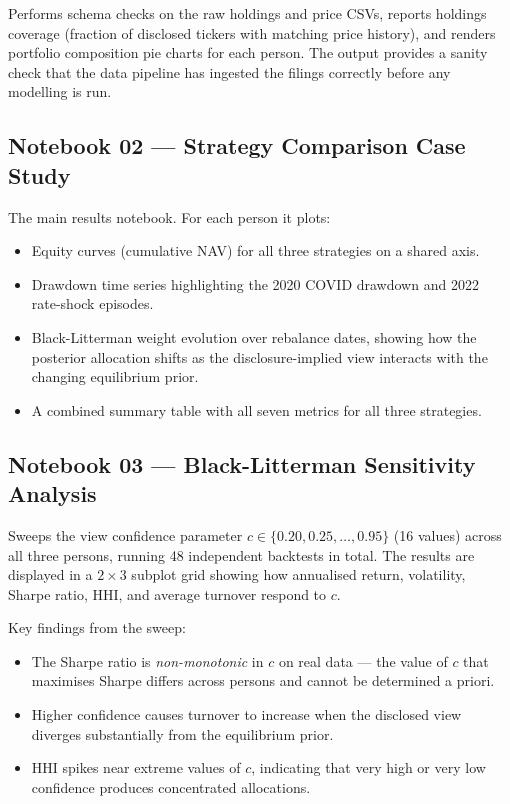 \documentclass[11pt, a4paper]{article}
\begin{document}
Performs schema checks on the raw holdings and price CSVs, reports holdings
coverage (fraction of disclosed tickers with matching price history), and
renders portfolio composition pie charts for each person. The output provides
a sanity check that the data pipeline has ingested the filings correctly before
any modelling is run.

\subsection{Notebook 02 --- Strategy Comparison Case Study}

The main results notebook. For each person it plots:
\begin{itemize}
  \item Equity curves (cumulative NAV) for all three strategies on a shared axis.
  \item Drawdown time series highlighting the 2020 COVID drawdown and 2022
        rate-shock episodes.
  \item Black-Litterman weight evolution over rebalance dates, showing how the
        posterior allocation shifts as the disclosure-implied view interacts with
        the changing equilibrium prior.
  \item A combined summary table with all seven metrics for all three strategies.
\end{itemize}

\subsection{Notebook 03 --- Black-Litterman Sensitivity Analysis}

Sweeps the view confidence parameter $c \in \{0.20, 0.25, \ldots, 0.95\}$
(16 values) across all three persons, running 48 independent backtests in
total. The results are displayed in a $2 \times 3$ subplot grid showing how
annualised return, volatility, Sharpe ratio, HHI, and average turnover respond
to $c$.

Key findings from the sweep:
\begin{itemize}
  \item The Sharpe ratio is \emph{non-monotonic} in $c$ on real data --- the
        value of $c$ that maximises Sharpe differs across persons and cannot
        be determined a priori.
  \item Higher confidence causes turnover to increase when the disclosed view
        diverges substantially from the equilibrium prior.
  \item HHI spikes near extreme values of $c$, indicating that very high or
        very low confidence produces concentrated allocations.
\end{itemize}
\end{document}
